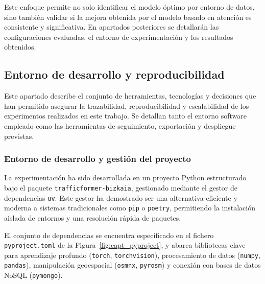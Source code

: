 
Este enfoque permite no solo identificar el modelo óptimo por entorno de datos, sino también validar si la mejora obtenida por el modelo basado en atención es consistente y significativa. En apartados posteriores se detallarán las configuraciones evaluadas, el entorno de experimentación y los resultados obtenidos.

\subsection{Entorno de desarrollo y reproducibilidad}
\label{sec:entorno_reproducibilidad}

Este apartado describe el conjunto de herramientas, tecnologías y decisiones que han permitido asegurar la trazabilidad, reproducibilidad y escalabilidad de los experimentos realizados en este trabajo. Se detallan tanto el entorno software empleado como las herramientas de seguimiento, exportación y despliegue previstas.

\subsubsection{Entorno de desarrollo y gestión del proyecto}

La experimentación ha sido desarrollada en un proyecto Python estructurado bajo el paquete \texttt{trafficformer-bizkaia}, gestionado mediante el gestor de dependencias \texttt{uv}. Este gestor ha demostrado ser una alternativa eficiente y moderna a sistemas tradicionales como \texttt{pip} o \texttt{poetry}, permitiendo la instalación aislada de entornos y una resolución rápida de paquetes.

El conjunto de dependencias se encuentra especificado en el fichero \texttt{pyproject.toml} de la Figura~\ref{fig:capt_pyproject}, y abarca bibliotecas clave para aprendizaje profundo (\texttt{torch}, \texttt{torchvision}), procesamiento de datos (\texttt{numpy}, \texttt{pandas}), manipulación geoespacial (\texttt{osmnx}, \texttt{pyrosm}) y conexión con bases de datos NoSQL (\texttt{pymongo}).

